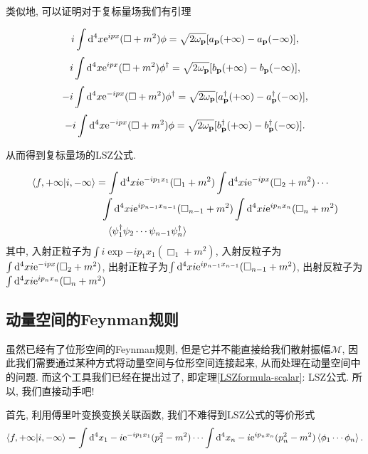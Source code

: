 类似地, 可以证明对于复标量场我们有引理
\begin{lemma}
    \begin{equation}
        i\int\mathrm d^4x\mathrm e^{ipx}(\Box+m^2)\phi=\sqrt{2\omega_{\mathbf{p}}}[a_{\mathbf{p}}(+\infty)-a_{\mathbf{p}}(-\infty)],
    \end{equation}
    \begin{equation}
        i\int\mathrm d^4x\mathrm e^{ipx}(\Box+m^2)\phi^\dagger=\sqrt{2\omega_{\mathbf{p}}}[b_{\mathbf{p}}(+\infty)-b_{\mathbf{p}}(-\infty)],
    \end{equation}
    \begin{equation}
        -i\int\mathrm d^4x\mathrm e^{-ipx}(\Box+m^2)\phi^\dagger=\sqrt{2\omega_{\mathbf{p}}}[a_{\mathbf{p}}^\dagger(+\infty)-a_{\mathbf{p}}^\dagger(-\infty)],
    \end{equation}
    \begin{equation}
        -i\int\mathrm d^4x\mathrm e^{-ipx}(\Box+m^2)\phi=\sqrt{2\omega_{\mathbf{p}}}[b_{\mathbf{p}}^\dagger(+\infty)-b_{\mathbf{p}}^\dagger(-\infty)].
    \end{equation}
\end{lemma}
从而得到复标量场的LSZ公式.
\begin{theorem}\label{LSZformula-complex}
    \begin{align}
        \braket{f, +\infty|i, -\infty}&=\int\mathrm d^4xi\mathrm e^{-ip_1x_1}(\Box_1+m^2)\int\mathrm d^4xi\mathrm e^{-ipx}(\Box_2+m^2)\cdots\notag\\
        &\;\;\int\mathrm d^4xi\mathrm e^{ip_{n-1}x_{n-1}}(\Box_{n-1}+m^2)\int\mathrm d^4xi\mathrm e^{ip_nx_n}(\Box_n+m^2)\notag\\
        &\;\;\;\;\braket{\psi_1^\dagger\psi_2\cdots\psi_{n-1}\psi_n^\dagger}
    \end{align}
    其中, 入射正粒子为$\int i\exp{-ip_1x_1}(\Box_1+m^2) $, 入射反粒子为$\int\mathrm d^4xi\mathrm e^{-ipx}(\Box_2+m^2)$, 出射正粒子为$\int\mathrm d^4xi\mathrm e^{ip_{n-1}x_{n-1}}(\Box_{n-1}+m^2)$, 出射反粒子为$\int\mathrm d^4xi\mathrm e^{ip_nx_n}(\Box_n+m^2)$
\end{theorem}

\subsection{动量空间的Feynman规则}
虽然已经有了位形空间的Feynman规则, 但是它并不能直接给我们散射振幅$\mathcal M$, 因此我们需要通过某种方式将动量空间与位形空间连接起来, 从而处理在动量空间中的问题. 而这个工具我们已经在提出过了, 即定理\ref{LSZformula-scalar}: LSZ公式. 所以, 我们直接动手吧!

首先, 利用傅里叶变换变换关联函数, 我们不难得到LSZ公式的等价形式
\begin{equation}
    \braket{f, +\infty|i, -\infty}=\int\mathrm d^4x_1 -i\mathrm e^{-ip_1x_1}(p_1^2-m^2)\cdots\int\mathrm d^4x_n -i\mathrm e^{ip_nx_n}(p_n^2-m^2)\braket{\phi_1\cdots\phi_n}.
\end{equation}

